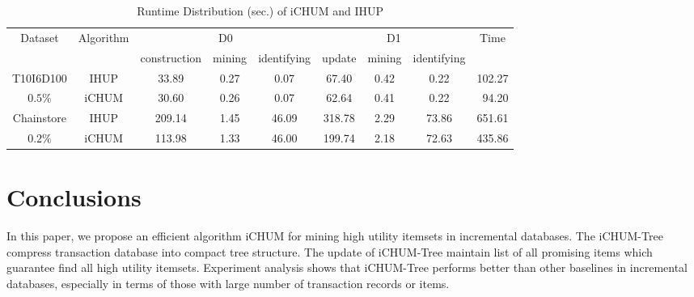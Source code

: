 \documentclass[runningheads,a4paper]{llncs}
\begin{document}
\begin{table}
\centering
\caption{Runtime Distribution (sec.) of iCHUM and IHUP}
\begin{tabular}{c*{7}{c}r}
\hline
\multirow{2}[0]{*}{Dataset}  & \multicolumn{1}{c}{\multirow{2}[0]{*}{Algorithm}}  & \multicolumn{3}{c}{D0}  &\multicolumn{3}{c}{D1}  & \multicolumn{1}{c}{\multirow{2}[0]{*}{Time}} \\
 & \multicolumn{1}{c}{}  & construction & mining& identifying  & update & mining  & identifying & \multicolumn{1}{c}{}  \\
\hline
T10I6D100   & IHUP &  33.89 &  0.27     & 0.07  &    67.40   & 0.42      &  0.22     & 102.27 \\
$  0.5 \% $ & iCHUM &   30.60    &   0.26    &   0.07   &  62.64     &   0.41    &    0.22   & 94.20 \\
\hline
Chainstore & IHUP   &   209.14    &   1.45   &    46.09   &   318.78    &   2.29   &   73.86    & 651.61 \\
$ 0.2 \% $ & iCHUM &   113.98    &  1.33      &  46.00     &  199.74     &   2.18    &  72.63     & 435.86 \\
\hline
\end{tabular}
\label{table:4}
\end{table}


\section{Conclusions}
In this paper, we propose an efficient algorithm iCHUM for mining high utility itemsets in incremental databases. The iCHUM-Tree compress transaction database into compact tree structure. The update of iCHUM-Tree maintain list of all promising items which guarantee find all high utility itemsets. Experiment analysis shows that iCHUM-Tree performs better than other baselines in incremental databases, especially in terms of those with large number of transaction records or items. 






\end{document}
